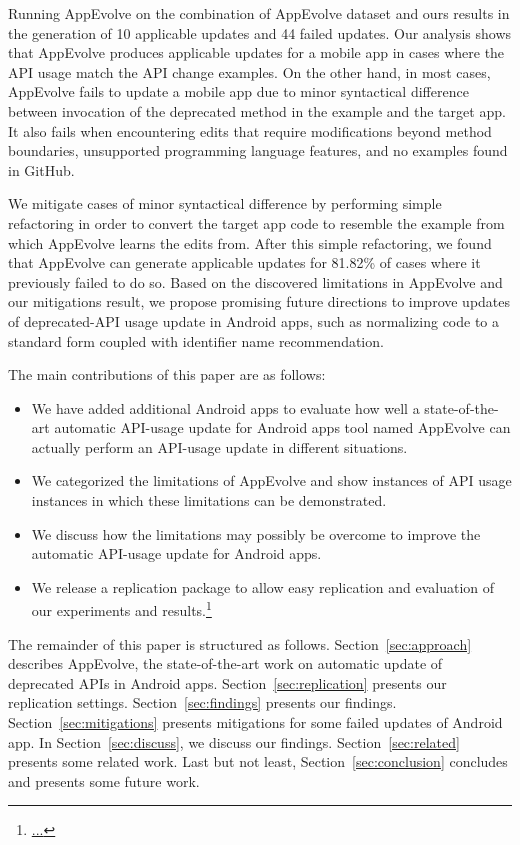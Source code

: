 Running AppEvolve on the combination of AppEvolve dataset and ours results in the generation of 10 applicable updates and 44 failed updates. Our analysis shows that AppEvolve produces applicable updates for a mobile app in cases where the API usage match the API change examples.  On the other hand, in most cases, AppEvolve fails to update a mobile app due to minor syntactical difference between invocation of the deprecated method in the example and the target app. It also fails when encountering edits that require modifications beyond method boundaries, unsupported programming language features, and no examples found in GitHub.

We mitigate cases of minor syntactical difference by performing simple refactoring in order to convert the target app code to resemble the example from which AppEvolve learns the edits from. After this simple refactoring, we found that AppEvolve can generate applicable updates for 81.82\% of cases where it previously failed to do so. Based on the discovered limitations in AppEvolve and our mitigations result, we propose promising future directions to improve updates of deprecated-API usage update in Android apps, such as normalizing code to a standard form coupled with identifier name recommendation.

The main contributions of this paper are as follows:
\begin{itemize}
    \item We have added additional Android apps to evaluate how well a state-of-the-art automatic API-usage update for Android apps tool named AppEvolve can actually perform an API-usage update in different situations.
    \item We categorized the limitations of AppEvolve and show instances of API usage instances in which these limitations can be demonstrated.
    \item We discuss how the limitations may possibly be overcome to improve the automatic API-usage update for Android apps.
    \item We release a replication package to allow easy replication and evaluation of our experiments and results.\footnote{\url{...}}
\end{itemize}

The remainder of this paper is structured as follows. Section~\ref{sec:approach} describes AppEvolve, the state-of-the-art work on automatic update of deprecated APIs in Android apps. Section~\ref{sec:replication} presents our replication settings. Section~\ref{sec:findings} presents our findings. Section~\ref{sec:mitigations} presents mitigations for some failed updates of Android app. In Section~\ref{sec:discuss}, we discuss our findings. Section~\ref{sec:related} presents some related work. Last but not least, Section~\ref{sec:conclusion} concludes and presents some future work.